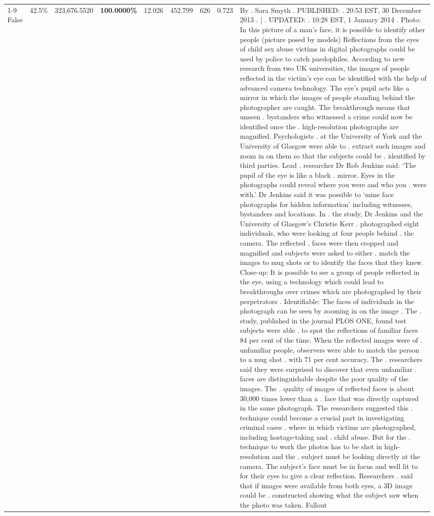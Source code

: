 \begin{table}[H]
\begin{tabular}{lllrlllll}
\cline{1-9}
False & 42.5\% & 323,676.5520 & \bfseries \color{red} 100.0000\% & 12.026 & 452.799 & 626 & 0.723 & By . Sara Smyth . PUBLISHED: . 20:53 EST, 30 December 2013 . | . UPDATED: . 10:28 EST, 1 January 2014 . Photo: In this picture of a man's face, it is possible to identify other people (picture posed by models) Reflections from the eyes of child sex abuse victims in digital photographs could be used by police to catch paedophiles. According to new research from two UK universities, the images of people reflected in the victim's eye can be identified with the help of advanced camera technology. The eye's pupil acts like a mirror in which the images of people standing behind the photographer are caught. The breakthrough means that unseen . bystanders who witnessed a crime could now be identified once the . high-resolution photographs are magnified. Psychologists . at the University of York and the University of Glasgow were able to . extract such images and zoom in on them so that the subjects could be . identified by third parties. Lead . researcher Dr Rob Jenkins said: ‘The pupil of the eye is like a black . mirror. Eyes in the photographs could reveal where you were and who you . were with.' Dr Jenkins said it was possible to ‘mine face photographs for hidden information' including witnesses, bystanders and locations. In . the study, Dr Jenkins and the University of Glasgow's Christie Kerr . photographed eight individuals, who were looking at four people behind . the camera. The reflected . faces were then cropped and magnified and subjects were asked to either . match the images to mug shots or to identify the faces that they knew. Close-up: It is possible to see a group of people reflected in the eye, using a technology which could lead to breakthroughs over crimes which are photographed by their perpetrators . Identifiable: The faces of individuals in the photograph can be seen by zooming in on the image . The . study, published in the journal PLOS ONE, found test subjects were able . to spot the reflections of familiar faces 84 per cent of the time. When the reflected images were of . unfamiliar people, observers were able to match the person to a mug shot . with 71 per cent accuracy. The . researchers said they were surprised to discover that even unfamiliar . faces are distinguishable despite the poor quality of the images. The . quality of images of reflected faces is about 30,000 times lower than a . face that was directly captured in the same photograph. The researchers suggested this . technique could become a crucial part in investigating criminal cases . where in which victims are photographed, including hostage-taking and . child abuse. But for the . technique to work the photos has to be shot in high-resolution and the . subject must be looking directly at the camera. The subject's face must be in focus and well lit to for their eyes to give a clear reflection. Researchers . said that if images were available from both eyes, a 3D image could be . constructed showing what the subject saw when the photo was taken. Fallout \\

\end{tabular}
\end{table}
